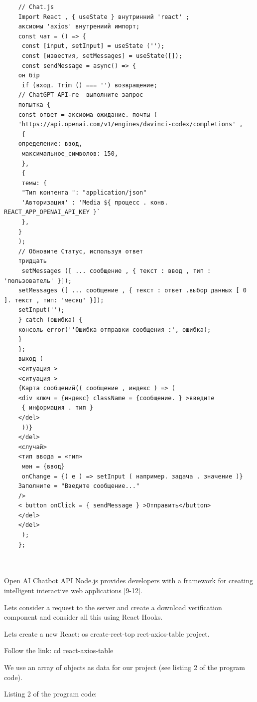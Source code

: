 \begin{lstlisting}
	// Chat.js
	Import React , { useState } внутринний 'react' ;
	аксиомы 'axios' внутрениий импорт;
	const чат = () => {
	 const [input, setInput] = useState ('');
	 const [известия, setMessages] = useState([]);
	 const sendMessage = async() => {
	он бір
	 if (вход. Trim () === '') возвращение;
	// ChatGPT API-ге  выполните запрос
	попытка {
	const ответ = аксиома ожидание. почты (
	'https://api.openai.com/v1/engines/davinci-codex/completions' ,
	 {
	определение: ввод,
	 максимальное_символов: 150,
	 },
	 {
	 темы: {
	 "Тип контента ": "application/json"
	 'Авторизация' : 'Media ${ процесс . конв. REACT_APP_OPENAI_API_KEY }` 
	 },
	}
	);
	// Обновите Статус, используя ответ
	тридцать
	 setMessages ([ ... сообщение , { текст : ввод , тип : 'пользователь' }]);
	setMessages ([ ... сообщение , { текст : ответ .выбор данных [ 0 ]. текст , тип: 'месяц' }]);
	setInput('');
	} catch (ошибка) {
	консоль error(''Ошибка отправки сообщения :', ошибка);
	}
	};
	выход (
	<ситуация >
	<ситуация >
	{Карта сообщений(( сообщение , индекс ) => (
	<div ключ = {индекс} className = {сообщение. } >введите
	 { информация . тип }
	</del>
	 ))}
	</del>
	<случай>
	<тип ввода = «тип»
	 мән = {ввод}
	 onChange = {( e ) => setInput ( например. задача . значение )}
	Заполните = "Введите сообщение..."
	/>
	< button onClick = { sendMessage } >Отправить</button>
	</del>
	</del>
	 );
	};
	
	

\end{lstlisting}


\begin{multicols}{2}

Open AI Chatbot API Node.js provides developers with a framework for
creating intelligent interactive web applications {[}9-12{]}.

Let\textquotesingle s consider a request to the server and create a
download verification component and consider all this using React Hooks.

Let\textquotesingle s create a new React: os create-rect-top
rect-axios-table project.

Follow the link: cd react-axios-table
\end{multicols}
\begin{multicols}{2}
We use an array of objects as data for our project (see listing 2 of the
program code).

Listing 2 of the program code:

\end{multicols}

